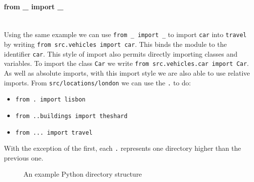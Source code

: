 \documentclass[12pt, titlepage]{article}
\begin{document}
\paragraph*{from \_ import \_} \mbox{} \\
Using the same example we can use \texttt{from \_ import \_} to import \texttt{car} into \texttt{travel} by writing \texttt{from src.vehicles import car}. This binds the module to the identifier \texttt{car}. This style of import also permits directly importing classes and variables. To import the class \texttt{Car} we write \texttt{from src.vehicles.car import Car}. \\
\indent As well as absolute imports, with this import style we are also able to use relative imports. From \texttt{src/locations/london} we can use the \texttt{.} to do:
\begin{itemize}
	\item \texttt{from . import lisbon}
	\item \texttt{from ..buildings import theshard}
	\item \texttt{from ... import travel}
\end{itemize}
With the exception of the first, each \texttt{.} represents one directory higher than the previous one.

\begin{figure}
\caption{An example Python directory structure}
\label{fig:directory}
\end{figure}
\end{document}
